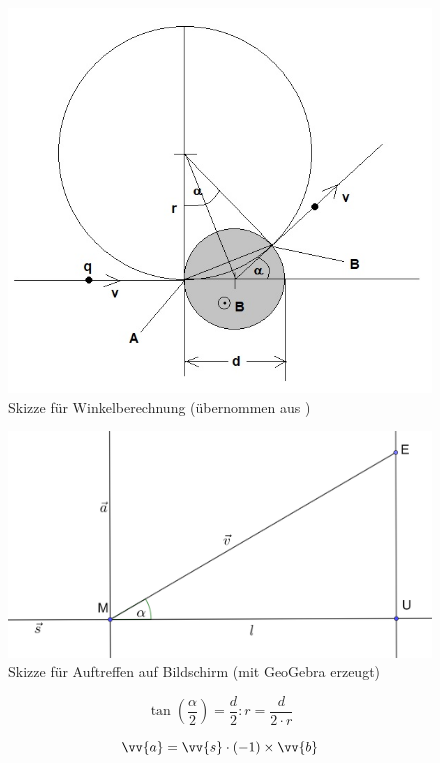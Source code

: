 \begin{figure}
    \centering
    \includegraphics[width=.75\textwidth]{fig/elektronenstrahl-ablenkung_101.jpg}
    \caption{Skizze für Winkelberechnung (übernommen aus \cite{Blog})}
    \label{fig:ausBlog}
\end{figure}

\begin{figure}
    \centering
    \includegraphics[width=.75\textwidth]{fig/Bildschirm_Skizze.png}
    \caption{Skizze für Auftreffen auf Bildschirm (mit GeoGebra erzeugt)}
    \label{fig:Schirm}
\end{figure}

\begin{equation}
    \label{eq:tan}
    \tan(\frac{\alpha}{2}) = \frac{d}{2}:r = \frac{d}{2 \cdot r}
\end{equation}

\begin{equation}
    \label{eq:a}
    \vv{a} = \vv{s} \cdot (-1) \times \vv{b}
\end{equation}

